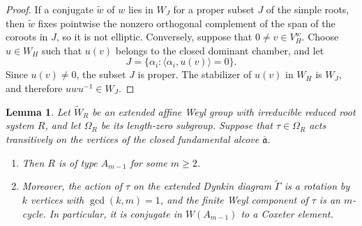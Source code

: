 \documentclass[11pt]{amsart}
\numberwithin{equation}{section}
\newtheorem{lemma}[lemma]{Lemma}
\theoremstyle{definition}
\theoremstyle{remark}
\begin{document}
\begin{proof}
If a conjugate $\widetilde w$ of $w$ lies in $W_J$ for a proper subset $J$ of the simple roots, then $\tilde{w}$ fixes
pointwise the nonzero orthogonal complement of the span of the coroots in
$J$, so it is not elliptic.  Conversely, suppose that $0\neq v\in V_H^w$.
Choose $u\in W_H$ such that $u(v)$ belongs to the closed dominant chamber,
and let
\[
  J=\{\alpha_i:\langle\alpha_i,u(v)\rangle=0\}.
\]
Since $u(v)\neq0$, the subset $J$ is proper.  The stabilizer of $u(v)$ in
$W_H$ is $W_J$, and therefore $uwu^{-1}\in W_J$.
\end{proof}

\begin{lemma}\label{lem:transitive-length-zero}
Let $\widetilde W_R$ be an extended affine Weyl group with irreducible
reduced root system $R$, and let $\Omega_R$ be its length-zero subgroup.
Suppose that $\tau\in\Omega_R$ acts transitively on the vertices of the
closed fundamental alcove $\overline{\mathfrak{a}}$.
\begin{enumerate}
\item 
Then $R$ is of type $A_{m-1}$ for some $m\geq2$. 
\item Moreover, the action of $\tau$ on the extended Dynkin diagram $\tilde{\Gamma}$ is a rotation
by $k$ vertices with $\gcd(k,m)=1$, and the finite Weyl component of $\tau$
is an $m$-cycle.  In particular, it is conjugate in $W(A_{m-1})$ to a Coxeter element.
\end{enumerate}
\end{lemma}
\end{document}
